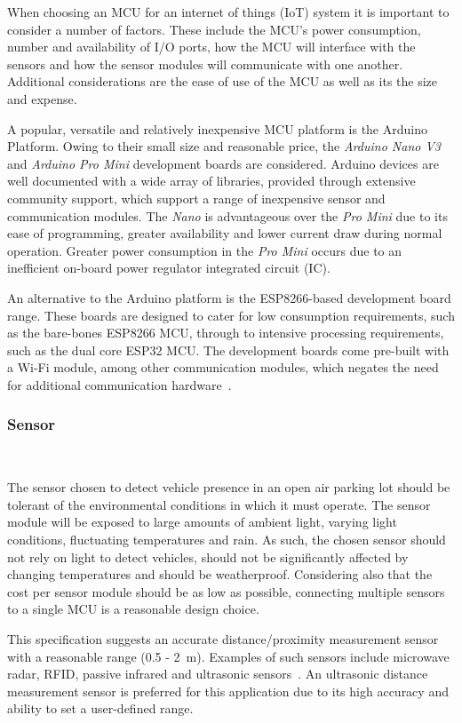 \documentclass[10pt,twocolumn]{witseiepaper}
\begin{document}
			When choosing an MCU for an internet of things (IoT) system it is important to consider a number of factors. These include the MCU's power consumption, number and availability of I/O ports, how the MCU will interface with the sensors and how the sensor modules will communicate with one another. Additional considerations are the ease of use of the MCU as well as its the size and expense.
			
			A popular, versatile and relatively inexpensive MCU platform is the Arduino Platform. Owing to their small size and reasonable price, the \textit{Arduino Nano V3} and \textit{Arduino Pro Mini} development boards are considered. Arduino devices are well documented with a wide array of libraries, provided through extensive community support, which support a range of inexpensive sensor and communication modules. The \textit{Nano} is advantageous over the \textit{Pro Mini} due to its ease of programming, greater availability and lower current draw during normal operation. Greater power consumption in the \textit{Pro Mini} occurs due to an inefficient on-board power regulator integrated circuit (IC).

			An alternative to the Arduino platform is the ESP8266-based development board range. 
			These boards are designed to cater for low consumption requirements, such as the bare-bones ESP8266 MCU, through to intensive processing requirements, such as the dual core ESP32 MCU. The development boards come pre-built with a \mbox{Wi-Fi} module, among other communication modules, which negates the need for additional communication hardware~\cite{esp12e}.
			
		\subsubsection{Sensor} $   $
			
			The sensor chosen to detect vehicle presence in an open air parking lot should be tolerant of the environmental conditions in which it must operate. The sensor module will be exposed to large amounts of ambient light, varying light conditions, fluctuating temperatures and rain. As such, the chosen sensor should not rely on light to detect vehicles, should not be significantly affected by changing temperatures and should be weatherproof. Considering also that the cost per sensor module should be as low as possible, connecting multiple sensors to a single MCU is a reasonable design choice.
			
			This specification suggests an accurate distance/proximity measurement sensor with a reasonable range (0.5 - 2~m). Examples of such sensors include microwave radar, RFID, passive infrared and ultrasonic sensors~\cite{parkingSystem}. An ultrasonic distance measurement sensor is preferred for this application due to its high accuracy and ability to set a user-defined range.
			
\end{document}
